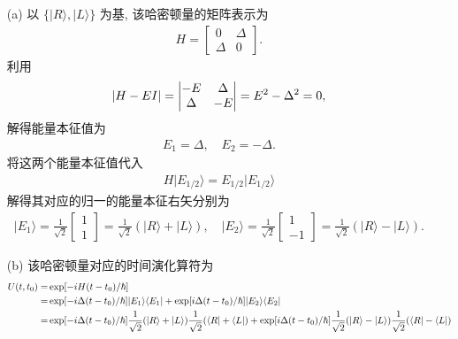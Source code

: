 \documentclass{assignment}
\begin{document}
\begin{sol}
    \begin{itemize}
        \item[(a)] 以 $\{\lvert R\rangle,\lvert L\rangle\}$ 为基, 该哈密顿量的矩阵表示为
        \begin{align}
            H=\begin{bmatrix}
                0&\Delta\\
                \Delta&0
            \end{bmatrix}.
        \end{align}
        利用
        \begin{align}
            \left\lvert H-EI\right\rvert=\begin{vmatrix}
                -E&\Delta\\
                \Delta&-E
            \end{vmatrix}=E^2-\Delta^2=0,
        \end{align}
        解得能量本征值为
        \begin{align}
            E_1=\Delta,\quad E_2=-\Delta.
        \end{align}
        将这两个能量本征值代入
        \begin{align}
            H\lvert E_{1/2}\rangle=E_{1/2}\lvert E_{1/2}\rangle
        \end{align}
        解得其对应的归一的能量本征右矢分别为
        \begin{align}
            \lvert E_1\rangle=\frac{1}{\sqrt{2}}\begin{bmatrix}
                1\\
                1
            \end{bmatrix}=\frac{1}{\sqrt{2}}(\lvert R\rangle+\lvert L\rangle),\quad\lvert E_2\rangle=\frac{1}{\sqrt{2}}\begin{bmatrix}
                1\\
                -1
            \end{bmatrix}=\frac{1}{\sqrt{2}}(\lvert R\rangle-\lvert L\rangle).
        \end{align}
        \item[(b)] 该哈密顿量对应的时间演化算符为
        \begin{align}
            \notag U(t,t_0)=&\exp[-iH(t-t_0)/\hbar]\\
            \notag=&\exp[-i\Delta(t-t_0)/\hbar]\lvert E_1\rangle\langle E_1\rvert+\exp[i\Delta(t-t_0)/\hbar]\lvert E_2\rangle\langle E_2\rvert\\
            \notag=&\exp[-i\Delta(t-t_0)/\hbar]\frac{1}{\sqrt{2}}(\lvert R\rangle+\lvert L\rangle)\frac{1}{\sqrt{2}}(\langle R\rvert+\langle L\rvert)+\exp[i\Delta(t-t_0)/\hbar]\frac{1}{\sqrt{2}}(\lvert R\rangle-\lvert L\rangle)\frac{1}{\sqrt{2}}(\langle R\rvert-\langle L\rvert)\\

\end{align}
\end{itemize}
\end{sol}
\end{document}
